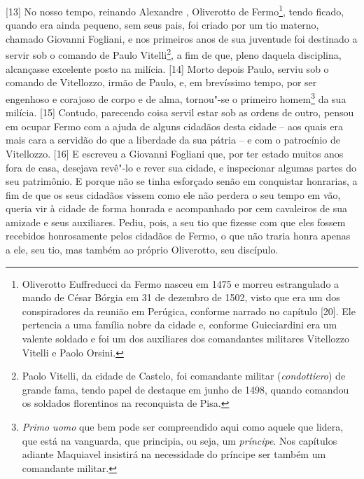 {[}13{]} No nosso tempo, reinando Alexandre , Oliverotto de
Fermo\footnote{Oliverotto Euffreducci da Fermo nasceu em 1475 e morreu
  estrangulado a mando de César Bórgia em 31 de dezembro de 1502, visto
  que era um dos conspiradores da reunião em Perúgica, conforme narrado
  no capítulo  {[}20{]}. Ele pertencia a uma família nobre da cidade
  e, conforme Guicciardini era um valente soldado e foi um dos
  auxiliares dos comandantes militares Vitellozzo Vitelli e Paolo
  Orsini.}, tendo ficado, quando era ainda pequeno, sem seus pais, foi
criado por um tio materno, chamado Giovanni Fogliani, e nos primeiros
anos de sua juventude foi destinado a servir sob o comando de Paulo
Vitelli\footnote{Paolo Vitelli, da cidade de Castelo, foi comandante
  militar (\emph{condottiero}) de grande fama, tendo papel de destaque
  em junho de 1498, quando comandou os soldados florentinos na
  reconquista de Pisa.}, a fim de que, pleno daquela disciplina,
alcançasse excelente posto na milícia. {[}14{]} Morto depois Paulo,
serviu sob o comando de Vitellozzo, irmão de Paulo, e, em brevíssimo
tempo, por ser engenhoso e corajoso de corpo e de alma, tornou"-se o
primeiro homem\footnote{\emph{Primo uomo} que bem pode ser compreendido
  aqui como aquele que lidera, que está na vanguarda, que principia, ou
  seja, um \emph{príncipe}. Nos capítulos adiante Maquiavel insistirá na
  necessidade do príncipe ser também um comandante militar.} da sua
milícia. {[}15{]} Contudo, parecendo coisa servil estar sob as ordens de
outro, pensou em ocupar Fermo com a ajuda de alguns cidadãos desta
cidade -- aos quais era mais cara a servidão do que a liberdade da sua
pátria -- e com o patrocínio de Vitellozzo. {[}16{]} E escreveu a
Giovanni Fogliani que, por ter estado muitos anos fora de casa, desejava
revê"-lo e rever sua cidade, e inspecionar algumas partes do seu
patrimônio. E porque não se tinha esforçado senão em conquistar
honrarias, a fim de que os seus cidadãos vissem como ele não perdera o
seu tempo em vão, queria vir à cidade de forma honrada e acompanhado por
cem cavaleiros de sua amizade e seus auxiliares. Pediu, pois, a seu tio
que fizesse com que eles fossem recebidos honrosamente pelos cidadãos de
Fermo, o que não traria honra apenas a ele, seu tio, mas também ao
próprio Oliverotto, seu discípulo.

